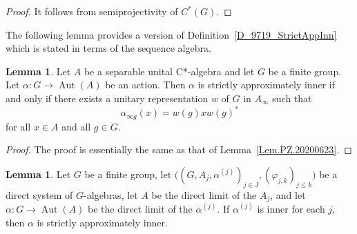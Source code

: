 \documentclass[10pt]{amsart}
\numberwithin{equation}{section}
\theoremstyle{definition}
\newtheorem{lem}[thm]{Lemma}
\newcommand{\Aut}{{\operatorname{Aut}}}
\begin{document}
\begin{proof}
It follows from semiprojectivity of $C^*(G)$. 
\end{proof}
%
The following lemma provides a version of  Definition~\ref{D_9719_StrictAppInn} which is stated in terms of the  sequence algebra. 
%
\begin{lem}
Let $A$ be a separable unital C*-algebra and let $G$ be a finite group.
Let $\alpha \colon G \to \Aut (A)$ be an action.
Then $\alpha$ is strictly approximately inner if and only if
there exists a unitary representation $w$ of $G$ in $A_{\infty}$ such that
\[
\alpha_{{\infty} g} (x) = w(g)x w(g)^*
\]
 for all  $x \in A$ and all $g \in G$.
\end{lem}
\begin{proof}
The proof is essentially the same as that of Lemma~\ref{Lem.PZ.20200623}.
\end{proof}
%
\begin{lem}\label{Lem_inlim_in_ap}
Let $G$ be a finite group, 
let $\big((G,A_j, \alpha^{(j)})_{j \in J} , (\varphi_{j,k})_{j\leq k} \big)$ be a direct system of $G$-algebras, 
let $A$ be the direct limit of the $A_j$,
and let $\alpha \colon G \to \Aut(A)$ be the direct limit of the $\alpha^{(j)}$. 
If $\alpha^{(j)}$ is inner for each $j$, then $\alpha$ is strictly approximately inner.
\end{lem}
\end{document}
